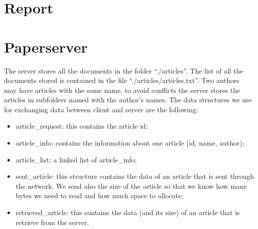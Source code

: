 





\maketitle

%
%
%
%
%


\section{Report}

\section{Paperserver}
The server stores all the documents in the folder ``./articles''. The list of all the documents stored is contained in the file ``./articles/articles.txt''. Two authors may have articles with the same name, to avoid conflicts the server stores the articles in subfolders named with the author's names.
The data structures we use for exchanging data between client and server are the following:
\begin{itemize}
\item article\_request: this contains the article id;
\item article\_info: contains the information about one article (id, name, author);
\item article\_list: a linked list of article\_info;
\item sent\_article: this structure contains the data of an article that is sent through the network. We send also the size of the article so that we know how many bytes we need to read and how much space to allocate;
\item retrieved\_article: this contains the data (and its size) of an article that is retrieve from the server.
\end{itemize}


